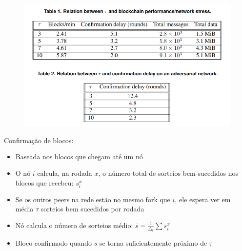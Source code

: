 \documentclass{beamer}
\begin{document}
\begin{frame}
\begin{figure}
    \centering
    \includegraphics[width=\textwidth]{images/results.png}
\end{figure}
\end{frame}

\begin{frame}
Confirmação de blocos:
\begin{itemize}
    \item Baseada nos blocos que chegam até um nó
    \item O nó $i$ calcula, na rodada $x$, o número total de sorteios bem-sucedidos nos blocos que recebeu: $s_{i}^{x}$
    \item Se os outros peers na rede estão no mesmo fork que $i$, ele espera ver em média $\tau$ sorteios bem sucedidos por rodada
    \item Nó calcula o número de sorteios médio: $ \bar{s} = \frac{1}{\Delta_r} \sum s_i^x$
    \item Bloco confirmado quando $\bar{s}$ se torna suficientemente próximo de $\tau$
\end{itemize}
\end{frame}
\end{document}
